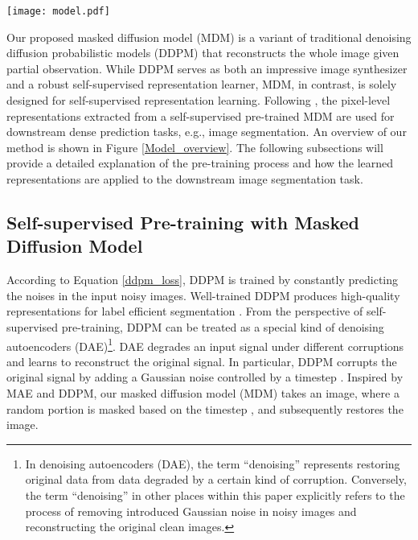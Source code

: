 \documentclass{article} \usepackage{iclr2024_conference,times}
\begin{document}
\begin{figure*}[!tp]
\centering
\texttt{[image: model.pdf]} \caption{\textbf{Overview of our proposed method.} During pre-training, only the masked diffusion model (Encoder and Decoder) in Step 1 is trained. During downstream segmentation task, the pre-trained model in Step 1 is frozen as a representation generator and the segmentation network in Step 2 is trained with the representations from Step 1.}
\label{Model_overview}
\end{figure*}


Our proposed masked diffusion model (MDM) is a variant of traditional denoising diffusion probabilistic models (DDPM) that reconstructs the whole image given partial observation. While DDPM serves as both an impressive image synthesizer and a robust self-supervised representation learner, MDM, in contrast, is solely designed for self-supervised representation learning. Following \citet{DBLP:conf/iclr/BaranchukVRKB22}, the pixel-level representations extracted from a self-supervised pre-trained MDM are used for downstream dense prediction tasks, e.g., image segmentation. An overview of our method is shown in Figure \ref{Model_overview}. 
The following subsections will provide a detailed explanation of the pre-training process and how the learned representations are applied to the downstream image segmentation task.


\subsection{Self-supervised Pre-training with Masked Diffusion Model}
According to Equation \ref{ddpm_loss}, DDPM is trained by constantly predicting the noises in the input noisy images. Well-trained DDPM produces high-quality representations for label efficient segmentation \citep{DBLP:conf/iclr/BaranchukVRKB22}. From the perspective of self-supervised pre-training, DDPM can be treated as a special kind of denoising autoencoders (DAE)\footnote{In denoising autoencoders (DAE), the term ``denoising'' represents restoring original data from data degraded by a certain kind of corruption. Conversely, the term ``denoising'' in other places within this paper explicitly refers to the process of removing introduced Gaussian noise in noisy images and reconstructing the original clean images.}. DAE degrades an input signal under different corruptions and learns to reconstruct the original signal. In particular, DDPM corrupts the original signal by adding a Gaussian noise controlled by a timestep . Inspired by MAE and DDPM, our masked diffusion model (MDM) takes an image, where a random portion is masked based on the timestep , and subsequently restores the image. 
\end{document}
